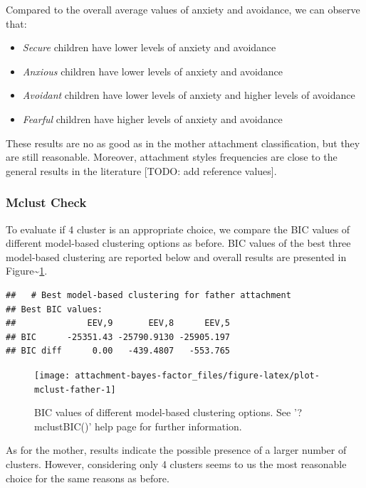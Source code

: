 \documentclass[
]{book}
\providecommand{\tightlist}{%
  \setlength{\itemsep}{0pt}\setlength{\parskip}{0pt}}
\begin{document}
Compared to the overall average values of anxiety and avoidance, we can observe that:

\begin{itemize}
\tightlist
\item
  \emph{Secure} children have lower levels of anxiety and avoidance
\item
  \emph{Anxious} children have lower levels of anxiety and avoidance
\item
  \emph{Avoidant} children have lower levels of anxiety and higher levels of avoidance
\item
  \emph{Fearful} children have higher levels of anxiety and avoidance
\end{itemize}

These results are no as good as in the mother attachment classification, but they are still reasonable. Moreover, attachment styles frequencies are close to the general results in the literature {[}TODO: add reference values{]}.

\hypertarget{mclust-check-1}{%
\subsubsection*{Mclust Check}\label{mclust-check-1}}

To evaluate if 4 cluster is an appropriate choice, we compare the BIC values of different model-based clustering options as before. BIC values of the best three model-based clustering are reported below and overall results are presented in Figure\textasciitilde\ref{fig:plot-mclust-father}.

\begin{verbatim}
##   # Best model-based clustering for father attachment
## Best BIC values:
##              EEV,9       EEV,8      EEV,5
## BIC      -25351.43 -25790.9130 -25905.197
## BIC diff      0.00   -439.4807   -553.765
\end{verbatim}

\begin{figure}

{\centering \texttt{[image: attachment-bayes-factor\_files/figure-latex/plot-mclust-father-1]} 

}

\caption{BIC values of different model-based clustering options. See '?mclustBIC()' help page for further information.}\label{fig:plot-mclust-father}
\end{figure}

As for the mother, results indicate the possible presence of a larger number of clusters. However, considering only 4 clusters seems to us the most reasonable choice for the same reasons as before.
\end{document}
